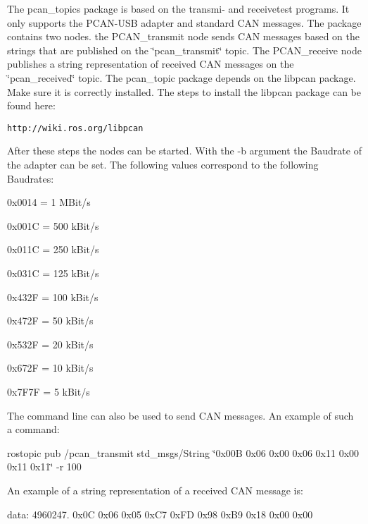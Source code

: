 

\-The pcan\-\_\-topics package is based on the transmi-\/ and receivetest programs. \-It only supports the \-P\-C\-A\-N-\/\-U\-S\-B adapter and standard \-C\-A\-N messages. \-The package contains two nodes. the \-P\-C\-A\-N\-\_\-transmit node sends \-C\-A\-N messages based on the strings that are published on the \char`\"{}pcan\-\_\-transmit\char`\"{} topic. \-The \-P\-C\-A\-N\-\_\-receive node publishes a string representation of received \-C\-A\-N messages on the \char`\"{}pcan\-\_\-received\char`\"{} topic. \-The pcan\-\_\-topic package depends on the libpcan package. \-Make sure it is correctly installed. \-The steps to install the libpcan package can be found here\-:

{\tt http\-://wiki.\-ros.\-org/libpcan}

\-After these steps the nodes can be started. \-With the -\/b argument the \-Baudrate of the adapter can be set. \-The following values correspond to the following \-Baudrates\-:

0x0014 = 1 \-M\-Bit/s \par
 0x001\-C = 500 k\-Bit/s \par
 0x011\-C = 250 k\-Bit/s \par
 0x031\-C = 125 k\-Bit/s \par
 0x432\-F = 100 k\-Bit/s \par
 0x472\-F = 50 k\-Bit/s \par
 0x532\-F = 20 k\-Bit/s \par
 0x672\-F = 10 k\-Bit/s \par
 0x7\-F7\-F = 5 k\-Bit/s \par


\-The command line can also be used to send \-C\-A\-N messages. \-An example of such a command\-:

rostopic pub /pcan\-\_\-transmit std\-\_\-msgs/\-String \char`\"{}0x00\-B 0x06 0x00 0x06 0x11 0x00 0x11 0x11\char`\"{} -\/r 100

\-An example of a string representation of a received \-C\-A\-N message is\-:

data\-: 4960247. 0x0\-C 0x06 0x05 0x\-C7 0x\-F\-D 0x98 0x\-B9 0x18 0x00 0x00 